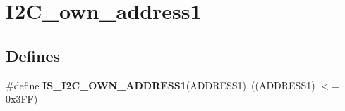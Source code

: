 \hypertarget{group__I2C__own__address1}{
\section{I2C\_\-own\_\-address1}
\label{group__I2C__own__address1}
}
\subsection*{Defines}
\begin{DoxyCompactItemize}
\item 
\hypertarget{group__I2C__own__address1_gad84e8b9523d45b6105b4d5cb68994a79}{
\#define {\bfseries IS\_\-I2C\_\-OWN\_\-ADDRESS1}(ADDRESS1)~((ADDRESS1) $<$= 0x3FF)}
\label{group__I2C__own__address1_gad84e8b9523d45b6105b4d5cb68994a79}

\end{DoxyCompactItemize}
